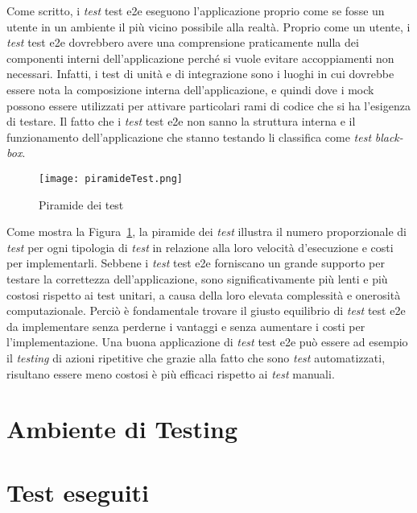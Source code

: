 Come scritto, i \emph{test} \gls{test e2e} eseguono l'applicazione proprio come se fosse un utente in un ambiente il più vicino possibile alla realtà. Proprio come un utente, i \emph{test} \gls{test e2e} dovrebbero avere una comprensione praticamente nulla dei componenti interni dell'applicazione perché si vuole evitare accoppiamenti non necessari. Infatti, i test di unità e di integrazione sono i luoghi in cui dovrebbe essere nota la composizione interna dell'applicazione, e quindi dove i mock possono essere utilizzati per attivare particolari rami di codice che si ha l'esigenza di testare. Il fatto che i \emph{test} \gls{test e2e} non sanno la struttura interna e il funzionamento dell'applicazione che stanno testando li classifica come \emph{test} \emph{black-box}.
\clearpage

\begin{figure}[!h] 
	\begin{center}
		\texttt{[image: piramideTest.png]}
		\caption{Piramide dei test}\label{fig:test}
	\end{center}
\end{figure}

Come mostra la Figura~\ref{fig:test}, la piramide dei \emph{test} illustra il numero proporzionale di \emph{test} per ogni tipologia di \emph{test} in relazione alla loro velocità d'esecuzione e costi per implementarli. Sebbene i \emph{test} \gls{test e2e} forniscano un grande supporto per testare la correttezza dell'applicazione, sono significativamente più lenti e più costosi rispetto ai test unitari, a causa della loro elevata complessità e onerosità computazionale. Perciò è fondamentale trovare il giusto equilibrio di \emph{test} \gls{test e2e} da implementare senza perderne i vantaggi e senza aumentare i costi per l'implementazione. Una buona applicazione di \emph{test} \gls{test e2e} può essere ad esempio il \emph{testing} di azioni ripetitive che grazie alla fatto che sono \emph{test} automatizzati, risultano essere meno costosi è più efficaci rispetto ai \emph{test} manuali.

\section{Ambiente di Testing}

\section{Test eseguiti}
